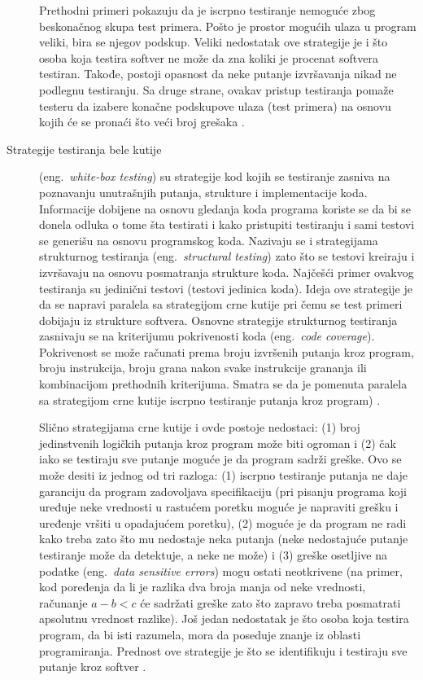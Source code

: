 \documentclass[12pt,oneside]{memoir}
\begin{document}
\begin{description}
Prethodni primeri pokazuju da je iscrpno testiranje nemoguće zbog beskonačnog skupa test primera. Pošto je prostor mogućih ulaza u program veliki, bira se njegov podskup. Veliki nedostatak ove strategije je i što osoba koja testira softver ne može da zna koliki je procenat softvera testiran. Takođe, postoji opasnost da neke putanje izvršavanja nikad ne podlegnu testiranju. Sa druge strane, ovakav pristup testiranja pomaže testeru da izabere konačne podskupove ulaza (test primera) na osnovu kojih će se pronaći što veći broj grešaka \cite{ArtOfST, PGtSTD}.

\item [Strategije testiranja bele kutije] (eng.~\textit{white-box testing}) su strategije kod kojih se testiranje zasniva na poznavanju unutrašnjih putanja, strukture i implementacije koda. Informacije dobijene na osnovu gledanja koda programa koriste se da bi se donela odluka o tome šta testirati i kako pristupiti testiranju i sami testovi se generišu na osnovu programskog koda. Nazivaju se i strategijama strukturnog testiranja (eng.~\textit{structural testing}) zato što se testovi kreiraju i izvršavaju na osnovu posmatranja strukture koda. Najčešći primer ovakvog testiranja su jedinični testovi (testovi jedinica koda). Ideja ove strategije je da se napravi paralela sa strategijom crne kutije pri čemu se test primeri dobijaju iz strukture softvera. Osnovne strategije strukturnog testiranja zasnivaju se na kriterijumu pokrivenosti koda (eng.~\textit{code coverage}). Pokrivenost se može računati prema broju izvršenih putanja kroz program, broju instrukcija, broju grana nakon svake instrukcije grananja ili kombinacijom prethodnih kriterijuma. Smatra se da je pomenuta paralela sa strategijom crne kutije iscrpno testiranje putanja kroz program) \cite{PGtSTD, SoftTest, mvj, ArtOfST}. 

Slično strategijama crne kutije i ovde postoje nedostaci: (1) broj jedinstvenih logičkih putanja kroz program može biti ogroman i (2) čak iako se testiraju sve putanje moguće je da program sadrži greške. Ovo se može desiti iz jednog od tri razloga: (1) iscrpno testiranje putanja ne daje garanciju da program zadovoljava specifikaciju (pri pisanju programa koji uređuje neke vrednosti u rastućem poretku moguće je napraviti grešku i uređenje vršiti u opadajućem poretku), (2) moguće je da program ne radi kako treba zato što mu nedostaje neka putanja (neke nedostajuće putanje testiranje može da detektuje, a neke ne može) i (3) greške osetljive na podatke (eng.~\textit{data sensitive errors}) mogu ostati neotkrivene (na primer, kod poređenja da li je razlika dva broja manja od neke vrednosti, računanje $a-b<c$ će sadržati greške zato što zapravo treba posmatrati apsolutnu vrednost razlike). Još jedan nedostatak je što osoba koja testira program, da bi isti razumela, mora da poseduje znanje iz oblasti programiranja. Prednost ove strategije je što se identifikuju i testiraju sve putanje kroz softver \cite{mvj, ArtOfST, PGtSTD}.


\end{description}
\end{document}

